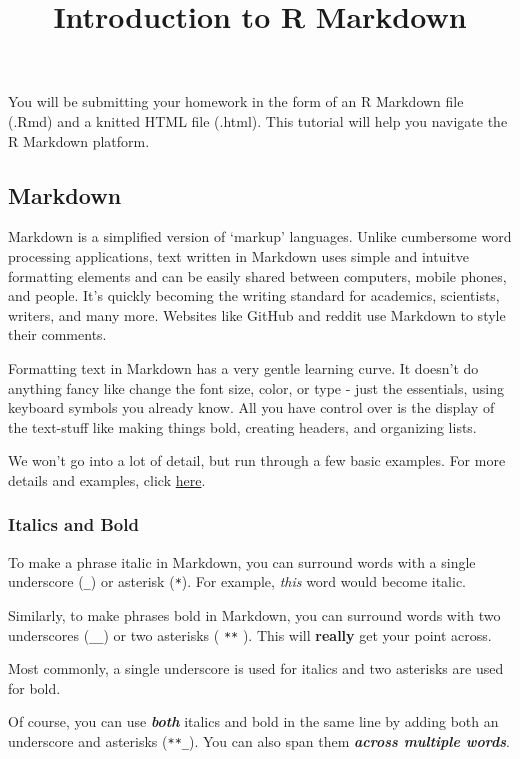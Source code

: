 \documentclass[
]{article}
\title{Introduction to R Markdown}
\author{}
\date{\vspace{-2.5em}}
\begin{document}
\maketitle

You will be submitting your homework in the form of an R Markdown file
(.Rmd) and a knitted HTML file (.html). This tutorial will help you
navigate the R Markdown platform.

\hypertarget{markdown}{%
\subsection{Markdown}\label{markdown}}

Markdown is a simplified version of `markup' languages. Unlike
cumbersome word processing applications, text written in Markdown uses
simple and intuitve formatting elements and can be easily shared between
computers, mobile phones, and people. It's quickly becoming the writing
standard for academics, scientists, writers, and many more. Websites
like GitHub and reddit use Markdown to style their comments.

Formatting text in Markdown has a very gentle learning curve. It doesn't
do anything fancy like change the font size, color, or type - just the
essentials, using keyboard symbols you already know. All you have
control over is the display of the text-stuff like making things bold,
creating headers, and organizing lists.

We won't go into a lot of detail, but run through a few basic examples.
For more details and examples, click
\href{https://www.markdowntutorial.com/}{here}.

\hypertarget{italics-and-bold}{%
\subsubsection{Italics and Bold}\label{italics-and-bold}}

To make a phrase italic in Markdown, you can surround words with a
single underscore (\texttt{\_}) or asterisk (\texttt{*}). For example,
\emph{this} word would become italic.

Similarly, to make phrases bold in Markdown, you can surround words with
two underscores (\texttt{\_\_}) or two asterisks ( \texttt{**} ). This
will \textbf{really} get your point across.

Most commonly, a single underscore is used for italics and two asterisks
are used for bold.

Of course, you can use \textbf{\emph{both}} italics and bold in the same
line by adding both an underscore and asterisks (\texttt{**\_}). You can
also span them \textbf{\emph{across multiple words}}.
\end{document}
